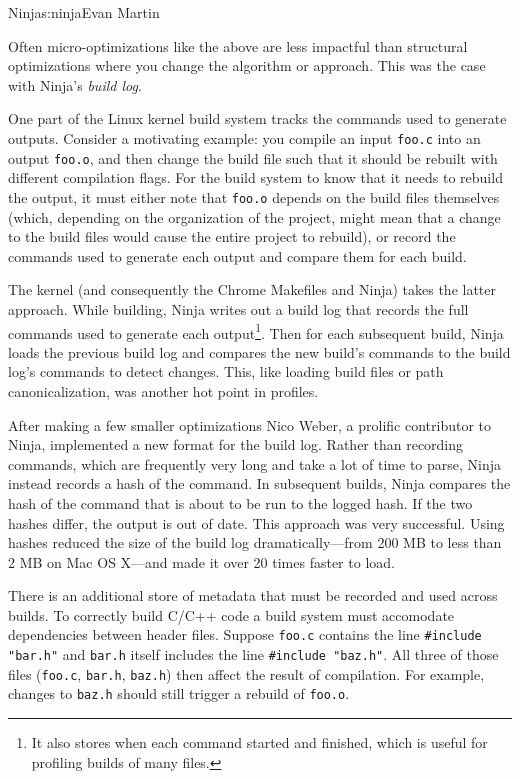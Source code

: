 \begin{aosachapter}{Ninja}{s:ninja}{Evan Martin}

Often micro-optimizations like the above are less impactful than
structural optimizations where you change the algorithm or approach.
This was the case with Ninja's \emph{build log}.

One part of the Linux kernel build system tracks the commands used to
generate outputs. Consider a motivating example: you compile an input
\texttt{foo.c} into an output \texttt{foo.o}, and then change the build
file such that it should be rebuilt with different compilation flags.
For the build system to know that it needs to rebuild the output, it
must either note that \texttt{foo.o} depends on the build files
themselves (which, depending on the organization of the project, might
mean that a change to the build files would cause the entire project to
rebuild), or record the commands used to generate each output and
compare them for each build.

The kernel (and consequently the Chrome Makefiles and Ninja) takes the
latter approach. While building, Ninja writes out a build log that
records the full commands used to generate each output\footnote{It also
  stores when each command started and finished, which is useful for
  profiling builds of many files.}. Then for each subsequent build,
Ninja loads the previous build log and compares the new build's commands
to the build log's commands to detect changes. This, like loading build
files or path canonicalization, was another hot point in profiles.

After making a few smaller optimizations Nico Weber, a prolific
contributor to Ninja, implemented a new format for the build log. Rather
than recording commands, which are frequently very long and take a lot
of time to parse, Ninja instead records a hash of the command. In
subsequent builds, Ninja compares the hash of the command that is about
to be run to the logged hash. If the two hashes differ, the output is
out of date. This approach was very successful. Using hashes reduced the
size of the build log dramatically---from 200 MB to less than 2 MB on
Mac OS X---and made it over 20 times faster to load.


There is an additional store of metadata that must be recorded and used
across builds. To correctly build C/C++ code a build system must
accomodate dependencies between header files. Suppose \texttt{foo.c}
contains the line \texttt{\#include "bar.h"} and \texttt{bar.h} itself
includes the line \texttt{\#include "baz.h"}. All three of those files
(\texttt{foo.c}, \texttt{bar.h}, \texttt{baz.h}) then affect the result
of compilation. For example, changes to \texttt{baz.h} should still
trigger a rebuild of \texttt{foo.o}.


\end{aosachapter}
